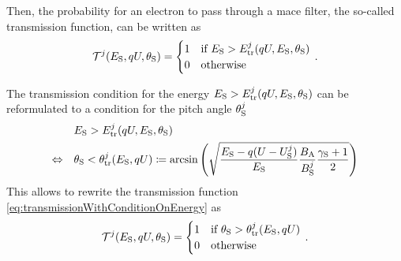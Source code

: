 Then, the probability for an electron to pass through a \gls{mace} filter, the so-called transmission function, can be written as
\begin{equation}
    \label{eq:transmissionWithConditionOnEnergy}
    \mathcal{T}^j(E_\mathrm{S}, qU, \theta_\mathrm{S}) =
    \begin{cases}
    1 & \text{if } E_\mathrm{S} > E^j_\mathrm{tr}(qU,E_\mathrm{S},\theta_\mathrm{S}) \\
    0 & \text{otherwise} 
    \end{cases}
    \text{\,.}
\end{equation}

The transmission condition for the energy $E_\mathrm{S} > E^j_\mathrm{tr}(qU,E_\mathrm{S},\theta_\mathrm{S})$ can be reformulated to a condition for the pitch angle $\theta_\mathrm{S}^j$
\begin{align}
    \label{eq:transmissionPitchAngle}
    &E_\mathrm{S} > E^j_\mathrm{tr}(qU,E_\mathrm{S},\theta_\mathrm{S}) \\
    \Leftrightarrow \quad
    & \theta_\mathrm{S} < \theta^j_\mathrm{tr}(E_\mathrm{S},qU)
    \coloneqq
    \arcsin
    \left(\sqrt{
        \frac{E_\mathrm{S}-q(U-U^j_\mathrm{S})}{E_\mathrm{S}} 
        \frac{B_\mathrm{A}}{B^j_\mathrm{S}}
        \frac{\gamma_\mathrm{S}+1}{2}
    }\right)
\end{align}
This allows to rewrite the transmission function \eqref{eq:transmissionWithConditionOnEnergy} as
\begin{equation}
    \label{eq:transmission}
    \mathcal{T}^j(E_\mathrm{S}, qU, \theta_\mathrm{S}) =
    \begin{cases}
    1 & \text{if } \theta_\mathrm{S} > \theta^j_\mathrm{tr}(E_\mathrm{S},qU) \\
    0 & \text{otherwise} 
    \end{cases}
    \text{\,.}
\end{equation}


